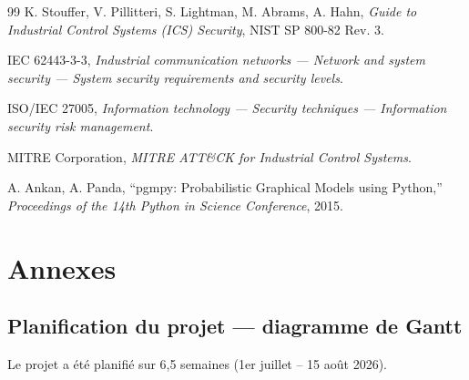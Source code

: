 \documentclass[12pt,a4paper]{article}
\newcommand{\forcereset}[1]{}
\begin{document}
\begin{thebibliography}{99}
K. Stouffer, V. Pillitteri, S. Lightman, M. Abrams, A. Hahn, \emph{Guide to Industrial Control Systems (ICS) Security}, NIST SP 800-82 Rev. 3.

IEC 62443-3-3, \emph{Industrial communication networks --- Network and system security --- System security requirements and security levels}.

ISO/IEC 27005, \emph{Information technology --- Security techniques --- Information security risk management}.

MITRE Corporation, \emph{MITRE ATT\&CK for Industrial Control Systems}.

A. Ankan, A. Panda, ``pgmpy: Probabilistic Graphical Models using Python,'' \emph{Proceedings of the 14th Python in Science Conference}, 2015.

\end{thebibliography}

\appendix
\section{Annexes}
\forcereset{6}

\subsection{Planification du projet --- diagramme de Gantt}
\forcereset{6}

Le projet a été planifié sur 6,5 semaines (1er juillet -- 15 août 2026).
\end{document}
